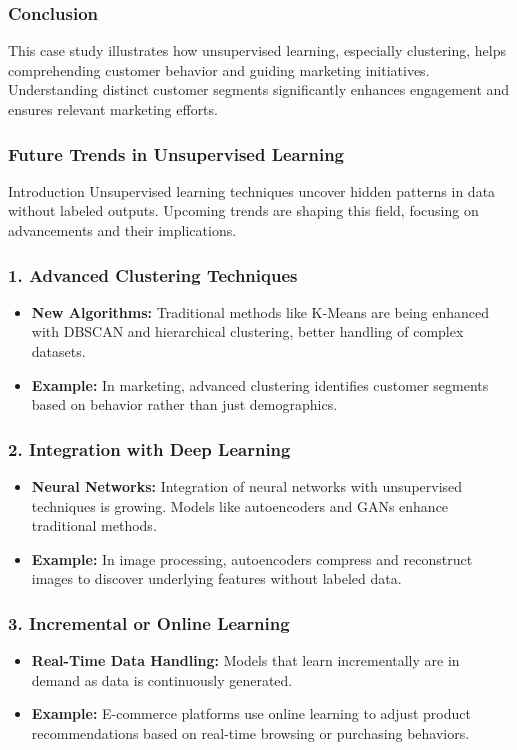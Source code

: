 \documentclass[aspectratio=169]{beamer}
\begin{document}
\begin{frame}[fragile]
    \frametitle{Conclusion}
    This case study illustrates how unsupervised learning, especially clustering, helps comprehending customer behavior and guiding marketing initiatives. Understanding distinct customer segments significantly enhances engagement and ensures relevant marketing efforts.
\end{frame}

\begin{frame}[fragile]
    \frametitle{Future Trends in Unsupervised Learning}
    \begin{block}{Introduction}
        Unsupervised learning techniques uncover hidden patterns in data without labeled outputs. Upcoming trends are shaping this field, focusing on advancements and their implications.
    \end{block}
\end{frame}

\begin{frame}[fragile]
    \frametitle{1. Advanced Clustering Techniques}
    \begin{itemize}
        \item \textbf{New Algorithms:} 
        Traditional methods like K-Means are being enhanced with DBSCAN and hierarchical clustering, better handling of complex datasets.
        
        \item \textbf{Example:} 
        In marketing, advanced clustering identifies customer segments based on behavior rather than just demographics.
    \end{itemize}
\end{frame}

\begin{frame}[fragile]
    \frametitle{2. Integration with Deep Learning}
    \begin{itemize}
        \item \textbf{Neural Networks:} 
        Integration of neural networks with unsupervised techniques is growing. Models like autoencoders and GANs enhance traditional methods.
        
        \item \textbf{Example:} 
        In image processing, autoencoders compress and reconstruct images to discover underlying features without labeled data.
    \end{itemize}
\end{frame}

\begin{frame}[fragile]
    \frametitle{3. Incremental or Online Learning}
    \begin{itemize}
        \item \textbf{Real-Time Data Handling:} 
        Models that learn incrementally are in demand as data is continuously generated.
        
        \item \textbf{Example:} 
        E-commerce platforms use online learning to adjust product recommendations based on real-time browsing or purchasing behaviors.
    \end{itemize}
\end{frame}
\end{document}
